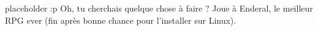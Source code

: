 placeholder :p
Oh, tu cherchais quelque chose à faire ?
Joue à Enderal, le meilleur RPG ever (fin après bonne chance pour l'installer sur Linux).
